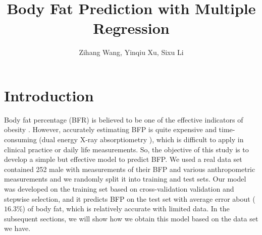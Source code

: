 \documentclass[letterpaper,10pt]{article}
\title{\textbf{Body Fat Prediction with Multiple Regression}}
\author{Zihang Wang, Yinqiu Xu, Sixu Li}
\begin{document}
\maketitle
\section{Introduction}
Body fat percentage (BFR) is believed to be one of the effective indicators of obesity \cite{relationship2015Ho}. However, accurately estimating BFP is quite expensive and time-consuming (dual energy X-ray absorptiometry \cite{anthropometric2016Lizak}), which is difficult to apply in clinical practice or daily life measurements. So, the objective of this study is to develop a simple but effective model to predict BFP. We used a real data set contained 252 male with measurements of their BFP and various anthropometric measurements and we randomly split it into training and test sets. Our model was developed on the training set based on cross-validation validation and stepwise selection, and it predicts BFP on the test set with average error about ($16.3\%$) of body fat, which is relatively accurate with limited data. In the subsequent sections, we will show how we obtain this model based on the data set we have.
\end{document}
